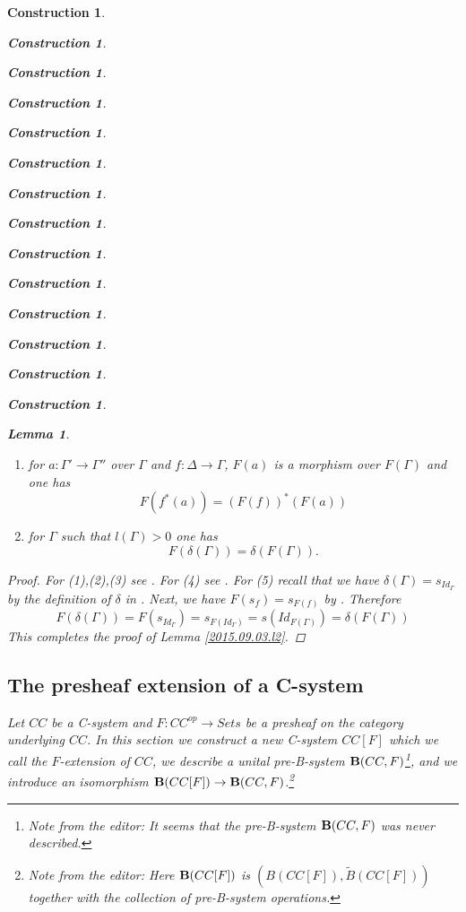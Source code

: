 \documentclass[onecolumn,12pt]{amsart}
\newtheorem{lemma}[proposition]{Lemma}
\numberwithin{proposition}{subsection}
\newtheorem{construction}[proposition]{Construction}
\newcommand{\sr}{\rightarrow}
\newcommand{\wt}{\widetilde}
\newcommand{\editorfootnote}[1]{\footnote{Note from the editor: #1}}
\begin{document}
\begin{construction}
\begin{construction}
\begin{construction}
\begin{construction}
\begin{construction}
\begin{construction}
\begin{construction}
\begin{construction}
\begin{construction}
\begin{construction}
\begin{construction}
\begin{construction}
\begin{construction}
\begin{construction}
\begin{lemma}
\begin{enumerate}
  \begin{equation*}
    \begin{split}
      F(f^*(\Gamma'))&=(F(f))^*(F(\Gamma')) \\
      F(q(f,\Gamma'))&=q(F(f),F(\Gamma'))
    \end{split}
  \end{equation*}
\item for $a:\Gamma'\sr \Gamma''$ over $\Gamma$ and $f:\Delta\sr \Gamma$, $F(a)$ is a morphism over $F(\Gamma)$ and one has
%
$$F(f^*(a))=(F(f))^*(F(a))$$
%
\item for $\Gamma$ such that $l(\Gamma)>0$ one has
%
$$F(\delta(\Gamma))=\delta(F(\Gamma)).$$
%
\end{enumerate}
\end{lemma}
%
\begin{proof}
For (1),(2),(3) see \cite[Lemma 2.5]{fromunivwithPiI}. For (4) see \cite[Lemma
  2.14]{fromunivwithPiI}. For (5) recall that we have
$\delta(\Gamma)=s_{Id_{\Gamma}}$ by the definition of $\delta$ in
\cite[p.~131]{Csubsystems}. Next, we have $F(s_f)=s_{F(f)}$ by \cite[Lemma
  3.4]{Cfromauniverse}. Therefore
%
$$F(\delta(\Gamma))=F(s_{Id_{\Gamma}})=s_{F(Id_{\Gamma})}=s(Id_{F(\Gamma)})=\delta(F(\Gamma))$$
%
This completes the proof of Lemma \ref{2015.09.03.l2}.  
\end{proof}
%
\subsection{The presheaf extension of a C-system}
\label{Fext}
%
Let $CC$ be a C-system and $F:CC^{op}\sr Sets$ be a presheaf on the category
underlying $CC$. In this section we construct a new C-system $CC[F]$ which we
call the {\em $F$-extension of $CC$}, we describe a unital pre-B-system $\bold B(CC,F)$\editorfootnote{It seems that the
  pre-B-system $\bold B(CC,F)$ was never described.}, and we introduce
an isomorphism $\bold B(CC[F]) \sr \bold B(CC,F)$.\editorfootnote{Here $\bold B(CC[F])$ is $(B(CC[F]),\wt{B}(CC[F]))$ together
  with the collection of pre-B-system operations.}


\end{construction}
\end{construction}
\end{construction}
\end{construction}
\end{construction}
\end{construction}
\end{construction}
\end{construction}
\end{construction}
\end{construction}
\end{construction}
\end{construction}
\end{construction}
\end{construction}
\end{document}
